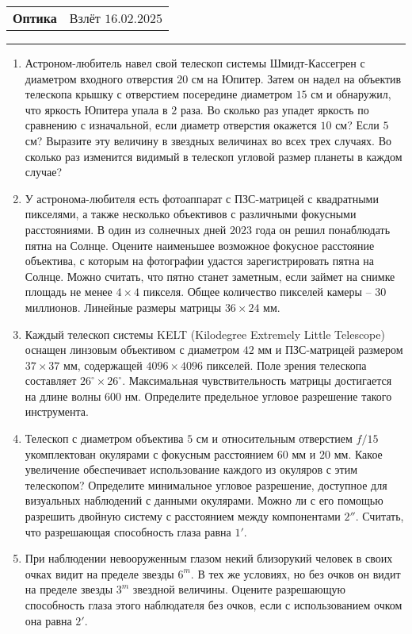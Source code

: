\documentclass[12pt]{article}
\begin{document}
\begin{tabularx}{\textwidth}{Xr}
{\Large \textbf{Оптика}} & Взлёт $16.02.2025$ \\
\end{tabularx}
\noindent\rule{\textwidth}{0.4pt}
\begin{enumerate}
    \item Астроном-любитель навел свой телескоп системы Шмидт-Кассегрен с диаметром входного отверстия $20$ см на Юпитер. Затем он надел на объектив телескопа крышку с отверстием посередине диаметром $15$ см и обнаружил, что яркость Юпитера упала в $2$ раза. Во сколько раз упадет яркость по сравнению с изначальной, если диаметр отверстия окажется $10$ см? Если $5$ см? Выразите эту величину в звездных величинах во всех трех случаях. Во сколько раз изменится видимый в телескоп угловой размер планеты в каждом случае?
    \item У астронома-любителя есть фотоаппарат с ПЗС-матрицей с квадратными пикселями, а также несколько объективов с различными фокусными расстояниями. В один из солнечных дней $2023$ года он решил понаблюдать пятна на Солнце. Оцените наименьшее возможное фокусное расстояние объектива, с которым на фотографии удастся зарегистрировать пятна на Солнце. Можно считать, что пятно станет заметным, если займет на снимке площадь не менее $4\times4$ пикселя. Общее количество пикселей камеры -- $30$ миллионов. Линейные размеры матрицы $36\times24$ мм.
    \item Каждый телескоп системы KELT (Kilodegree Extremely Little Telescope) оснащен линзовым объективом с диаметром $42$ мм и ПЗС-матрицей размером $37\times37$ мм, содержащей $4096\times4096$ пикселей. Поле зрения телескопа составляет $26^{\circ}\times26^{\circ}$. Максимальная чувствительность матрицы достигается на длине волны $600$ нм. Определите предельное угловое разрешение такого инструмента.
    \item Телескоп с диаметром объектива $5$ см и относительным отверстием $f/15$ укомплектован окулярами с фокусным расстоянием $60$ мм и $20$ мм. Какое увеличение обеспечивает использование каждого из окуляров с этим телескопом? Определите минимальное угловое разрешение, доступное для визуальных наблюдений с данными окулярами. Можно ли с его помощью разрешить двойную систему с расстоянием между компонентами $2''$. Считать, что разрешающая способность глаза равна $1'$. 
    \item При наблюдении невооруженным глазом некий близорукий человек в своих очках видит на пределе звезды $6^m$. В тех же условиях, но без очков он видит на пределе звезды $3^m$ звездной величины. Оцените разрешающую способность глаза этого наблюдателя без очков, если с использованием очком она равна $2'$.

\end{enumerate}
\end{document}
